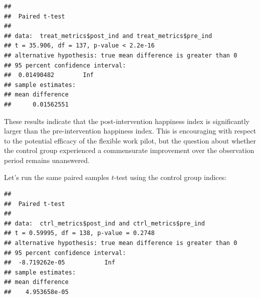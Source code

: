 \documentclass[
]{book}
\newenvironment{Shaded}{\begin{snugshade}}{\end{snugshade}}
\newcommand{\AttributeTok}[1]{\textcolor[rgb]{0.77,0.63,0.00}{#1}}
\newcommand{\CommentTok}[1]{\textcolor[rgb]{0.56,0.35,0.01}{\textit{#1}}}
\newcommand{\ConstantTok}[1]{\textcolor[rgb]{0.00,0.00,0.00}{#1}}
\newcommand{\FunctionTok}[1]{\textcolor[rgb]{0.00,0.00,0.00}{#1}}
\newcommand{\NormalTok}[1]{#1}
\newcommand{\SpecialCharTok}[1]{\textcolor[rgb]{0.00,0.00,0.00}{#1}}
\newcommand{\StringTok}[1]{\textcolor[rgb]{0.31,0.60,0.02}{#1}}
\begin{document}
\begin{Shaded}
\end{Shaded}

\begin{verbatim}
## 
##  Paired t-test
## 
## data:  treat_metrics$post_ind and treat_metrics$pre_ind
## t = 35.906, df = 137, p-value < 2.2e-16
## alternative hypothesis: true mean difference is greater than 0
## 95 percent confidence interval:
##  0.01490482        Inf
## sample estimates:
## mean difference 
##      0.01562551
\end{verbatim}

These results indicate that the post-intervention happiness index is significantly larger than the pre-intervention happiness index. This is encouraging with respect to the potential efficacy of the flexible work pilot, but the question about whether the control group experienced a commensurate improvement over the observation period remains unanswered.

Let's run the same paired samples \(t\)-test using the control group indices:

\begin{Shaded}
\end{Shaded}

\begin{verbatim}
## 
##  Paired t-test
## 
## data:  ctrl_metrics$post_ind and ctrl_metrics$pre_ind
## t = 0.59995, df = 138, p-value = 0.2748
## alternative hypothesis: true mean difference is greater than 0
## 95 percent confidence interval:
##  -8.719262e-05           Inf
## sample estimates:
## mean difference 
##    4.953658e-05
\end{verbatim}
\end{document}
